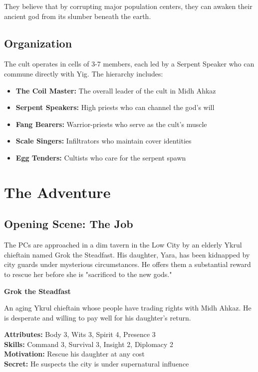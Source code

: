 \documentclass[12pt,twoside]{article}
\newenvironment{npcbox}[1]{
  \begin{mdframed}[
    linewidth=1pt,
    linecolor=dungeongray,
    backgroundcolor=white,
    innertopmargin=5pt,
    innerbottommargin=5pt,
    innerrightmargin=5pt,
    innerleftmargin=5pt
  ]
  \textbf{#1}
}{\end{mdframed}}
\begin{document}
They believe that by corrupting major population centers, they can awaken their ancient god from its slumber beneath the earth.

\subsection{Organization}

The cult operates in cells of 3-7 members, each led by a Serpent Speaker who can commune directly with Yig. The hierarchy includes:
\begin{itemize}
  \item \textbf{The Coil Master:} The overall leader of the cult in Midh Ahkaz
  \item \textbf{Serpent Speakers:} High priests who can channel the god's will
  \item \textbf{Fang Bearers:} Warrior-priests who serve as the cult's muscle
  \item \textbf{Scale Singers:} Infiltrators who maintain cover identities
  \item \textbf{Egg Tenders:} Cultists who care for the serpent spawn
\end{itemize}

\section{The Adventure}

\subsection{Opening Scene: The Job}

The PCs are approached in a dim tavern in the Low City by an elderly Ykrul chieftain named Grok the Steadfast. His daughter, Yara, has been kidnapped by city guards under mysterious circumstances. He offers them a substantial reward to rescue her before she is "sacrificed to the new gods."

\begin{npcbox}{Grok the Steadfast}
An aging Ykrul chieftain whose people have trading rights with Midh Ahkaz. He is desperate and willing to pay well for his daughter's return.

\textbf{Attributes:} Body 3, Wits 3, Spirit 4, Presence 3 \\
\textbf{Skills:} Command 3, Survival 3, Insight 2, Diplomacy 2 \\
\textbf{Motivation:} Rescue his daughter at any cost \\
\textbf{Secret:} He suspects the city is under supernatural influence
\end{npcbox}
\end{document}
